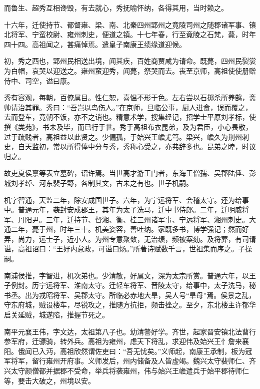 \documentclass[12pt,UTF8]{ctexbook}
\begin{document}
而鲁生、超秀互相谗毁，有去就心，秀抚喻怀纳，各得其用，当时赖之。

十六年，迁使持节、都督雍、梁、南、北秦四州郢州之竟陵司州之随郡诸军事、镇北将军、宁蛮校尉、雍州刺史，便道之镇。十七年春，行至竟陵之石梵，薨，时年四十四。高祖闻之，甚痛悼焉。遣皇子南康王绩缘道迎候。

初，秀之西也，郢州民相送出境，闻其疾，百姓商贾咸为请命。既薨，四州民裂裳为白帽，哀哭以迎送之。雍州蛮迎秀，闻薨，祭哭而去。丧至京师，高祖使使册赠侍中、司空，谥曰康。

秀有容观，每朝，百僚属目。性仁恕，喜愠不形于色。左右尝以石掷杀所养鹄，斋帅请治其罪。秀曰：“吾岂以鸟伤人。”在京师，旦临公事，厨人进食，误而覆之，去而登车，竟朝不饭，亦不之诮也。精意术学，搜集经记，招学士平原刘孝标，使撰《类苑》，书未及毕，而已行于世。秀于高祖布衣昆弟，及为君臣，小心畏敬，过于疏贱者，高祖益以此贤之。少偏孤，于始兴王嶦尤笃。梁兴，嶦久为荆州刺史，自天监初，常以所得俸中分与秀，秀称心受之，亦弗辞多也。昆弟之睦，时议归之。

故吏夏侯禀等表立墓碑，诏许焉。当世高才游王门者，东海王僧孺、吴郡陆倕、彭城刘孝绰、河东裴子野，各制其文，古未之有也。世子机嗣。

机字智通，天监二年，除安成国世子。六年，为宁远将军、会稽太守。还为给事中。普通元年，袭封安成郡王，其年为太子洗马，迁中书侍郎。二年，迁明威将军、丹阳尹。三年，迁持节、督湘、衡、桂三州诸军事、宁远将军、湘州刺史。大通二年，薨于州，时年三十。机美姿容，善吐纳。家既多书，博学强记；然而好弄，尚力，远士子，近小人。为州专意聚敛，无治绩，频被案劾。及将葬，有司请谥，高祖诏曰：“王好内怠政，可谥曰炀。”所著诗赋数千言，世祖集而序之。子操嗣。

南浦侯推，字智进，机次弟也。少清敏，好属文，深为太宗所赏。普通六年，以王子例封。历宁远将军、淮南太守。迁轻车将军、晋陵太守，给事中，太子洗马，秘书丞。出为戎昭将军、吴郡太守。所临必赤地大旱，吴人号“旱母”焉。侯景之乱，守东府城，贼设楼车，尽锐攻之，推随方抗拒，频击挫之。至夕，东北楼主许郁华启关延贼，城遂陷，推握节死之。

南平元襄王伟，字文达，太祖第八子也。幼清警好学。齐世，起家晋安镇北法曹行参军府，迁骠骑，转外兵。高祖为雍州，虑天下将乱，求迎伟及始兴王忄詹来襄阳。俄闻已入沔，高祖欣然谓佐吏曰：“吾无忧矣。”义师起，南康王承制，板为冠军将军，留行雍州开府事。义师发后，州内储备及人皆虚竭。魏兴太守裴师仁、齐兴太守颜僧都并据郡不受命，举兵将袭雍州，伟与始兴王嶦遣兵于始平郡待师仁等，要击大破之，州境以安。
\end{document}
